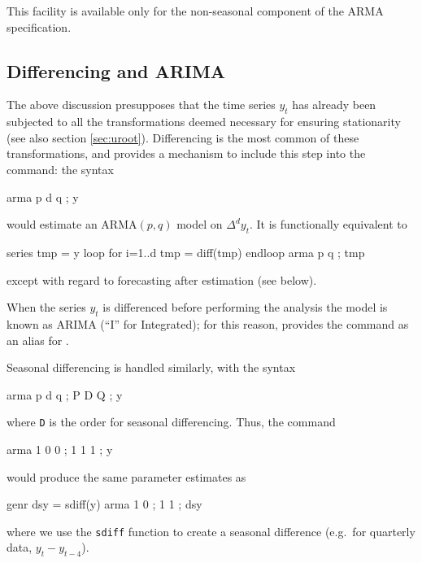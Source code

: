 This facility is available only for the non-seasonal component of
the ARMA specification.

\subsection{Differencing and ARIMA}

The above discussion presupposes that the time series $y_t$ has
already been subjected to all the transformations deemed necessary for
ensuring stationarity (see also section \ref{sec:uroot}). Differencing
is the most common of these transformations, and  provides
a mechanism to include this step into the  command: the
syntax
\begin{code}
arma p d q ; y 
\end{code}
would estimate an ARMA$(p,q)$ model on $\Delta^d y_t$. It is
functionally equivalent to 
\begin{code}
series tmp = y
loop for i=1..d
  tmp = diff(tmp)
endloop
arma p q ; tmp 
\end{code}
except with regard to forecasting after estimation (see below).

When the series $y_t$ is differenced before performing the analysis
the model is known as ARIMA (``I'' for Integrated); for this reason,
 provides the  command as an alias for
.

Seasonal differencing is handled similarly, with the syntax
\begin{code}
arma p d q ; P D Q ; y 
\end{code}
where \texttt{D} is the order for seasonal differencing.  Thus, the
command
\begin{code}
arma 1 0 0 ; 1 1 1 ; y 
\end{code}
would produce the same parameter estimates as
\begin{code}
genr dsy = sdiff(y)
arma 1 0 ; 1 1 ; dsy 
\end{code}
where we use the \texttt{sdiff} function to create a seasonal
difference (e.g.\ for quarterly data, $y_t - y_{t-4}$).

